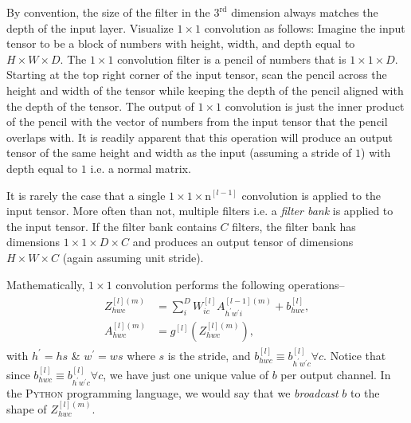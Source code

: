 \documentclass[modern]{aastex61}
\newcommand{\un}{\mathrm{n}}
\begin{document}
By convention, the size of the filter in the $3^{\mathrm{rd}}$ dimension always matches the depth of the input layer. Visualize $1 \times 1$ convolution as follows: Imagine the input tensor to be a block of numbers with height, width, and depth equal to $H \times W \times D$. The $1 \times 1$ convolution filter is a pencil of numbers that is $1 \times 1 \times D$. Starting at the top right corner of the input tensor, scan the pencil across the height and width of the tensor while keeping the depth of the pencil aligned with the depth of the tensor. The output of $1 \times 1$ convolution is just the inner product of the pencil with the vector of numbers from the input tensor that the pencil overlaps with. It is readily apparent that this operation will produce an output tensor of the same height and width as the input (assuming a stride of $1$) with depth equal to $1$ i.e. a normal matrix.

It is rarely the case that a single $1 \times 1 \times \un^{[l-1]}$ convolution is applied to the input tensor. More often than not, multiple filters i.e. a \textit{filter bank} is applied to the input tensor. If the filter bank contains $C$ filters, the filter bank has dimensions $1 \times 1 \times D \times C$ and produces an output tensor of dimensions $H \times W \times C$ (again assuming unit stride).

Mathematically, $1 \times 1$ convolution performs the following operations--
\begin{align} \label{eq:conv11}
\begin{split}
  Z^{[l](m)}_{hwc} &= \sum_{i}^{D} W^{[l]}_{ic}A^{[l-1](m)}_{h^{'}w^{'}i} + b^{[l]}_{hwc},
\\
  A^{[l](m)}_{hwc} &= g^{[l]}(Z^{[l](m)}_{hwc}),
\end{split}
\end{align}
with $h^{'} = hs$ \& $w^{'} = ws$ where $s$ is the stride, and $b^{[l]}_{hwc} \equiv b^{[l]}_{h^{'}w^{'}c} \forall c$. Notice that since $b^{[l]}_{hwc} \equiv b^{[l]}_{h^{'}w^{'}c} \forall c$, we have just one unique value of $b$ per output channel. In the \textsc{Python} programming language, we would say that we \textit{broadcast} $b$ to the shape of $Z^{[l](m)}_{hwc}$.
\end{document}

